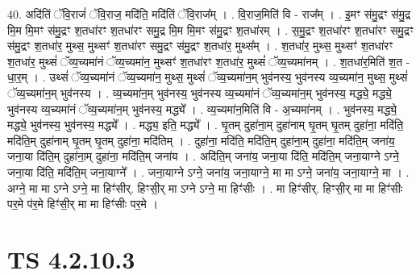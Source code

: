 \documentclass[17pt]{extarticle}
\begin{document}
40. अदि॑तिं ॅवि॒राजं॑ ॅवि॒राज॒ मदि॑ति॒ मदि॑तिं ॅवि॒राज᳚म् । . वि॒राज॒मिति॑ वि - राज᳚म् । . इ॒मꣳ स॑मु॒द्रꣳ स॑मु॒द्र मि॒म मि॒मꣳ स॑मु॒द्रꣳ श॒तधा॑रꣳ श॒तधा॑रꣳ समु॒द्र मि॒म मि॒मꣳ स॑मु॒द्रꣳ श॒तधा॑रम् । . स॒मु॒द्रꣳ श॒तधा॑रꣳ श॒तधा॑रꣳ समु॒द्रꣳ स॑मु॒द्रꣳ श॒तधा॑र॒ मुथ्स॒ मुथ्सꣳ॑ श॒तधा॑रꣳ समु॒द्रꣳ स॑मु॒द्रꣳ श॒तधा॑र॒ मुथ्स᳚म् । . श॒तधा॑र॒ मुथ्स॒ मुथ्सꣳ॑ श॒तधा॑रꣳ श॒तधा॑र॒ मुथ्सं॑ ॅव्य॒च्यमा॑नं ॅव्य॒च्यमा॑न॒ मुथ्सꣳ॑ श॒तधा॑रꣳ श॒तधा॑र॒ मुथ्सं॑ ॅव्य॒च्यमा॑नम् । . श॒तधा॑र॒मिति॑ श॒त - धा॒र॒म् । . उथ्सं॑ ॅव्य॒च्यमा॑नं ॅव्य॒च्यमा॑न॒ मुथ्स॒ मुथ्सं॑ ॅव्य॒च्यमा॑न॒म् भुव॑नस्य॒ भुव॑नस्य व्य॒च्यमा॑न॒ मुथ्स॒ मुथ्सं॑ ॅव्य॒च्यमा॑न॒म् भुव॑नस्य । . व्य॒च्यमा॑न॒म् भुव॑नस्य॒ भुव॑नस्य व्य॒च्यमा॑नं ॅव्य॒च्यमा॑न॒म् भुव॑नस्य॒ मद्ध्ये॒ मद्ध्ये॒ भुव॑नस्य व्य॒च्यमा॑नं ॅव्य॒च्यमा॑न॒म् भुव॑नस्य॒ मद्ध्ये᳚ । . व्य॒च्यमा॑न॒मिति॑ वि - अ॒च्यमा॑नम् । . भुव॑नस्य॒ मद्ध्ये॒ मद्ध्ये॒ भुव॑नस्य॒ भुव॑नस्य॒ मद्ध्ये᳚ । . मद्ध्य॒ इति॒ मद्ध्ये᳚ । . घृ॒तम् दुहा॑ना॒म् दुहा॑नाम् घृ॒तम् घृ॒तम् दुहा॑ना॒ मदि॑ति॒ मदि॑ति॒म् दुहा॑नाम् घृ॒तम् घृ॒तम् दुहा॑ना॒ मदि॑तिम् । . दुहा॑ना॒ मदि॑ति॒ मदि॑ति॒म् दुहा॑ना॒म् दुहा॑ना॒ मदि॑ति॒म् जना॑य॒ जना॒या दि॑ति॒म् दुहा॑ना॒म् दुहा॑ना॒ मदि॑ति॒म् जना॑य । . अदि॑ति॒म् जना॑य॒ जना॒या दि॑ति॒ मदि॑ति॒म् जना॒याग्ने ऽग्ने॒ जना॒या दि॑ति॒ मदि॑ति॒म् जना॒याग्ने᳚ । . जना॒याग्ने ऽग्ने॒ जना॑य॒ जना॒याग्ने॒ मा मा ऽग्ने॒ जना॑य॒ जना॒याग्ने॒ मा । . अग्ने॒ मा मा ऽग्ने ऽग्ने॒ मा हिꣳ॑सीर्. हिꣳसी॒र् मा ऽग्ने ऽग्ने॒ मा हिꣳ॑सीः । . मा हिꣳ॑सीर्. हिꣳसी॒र् मा मा हिꣳ॑सीः पर॒मे प॑र॒मे हिꣳ॑सी॒र् मा मा हिꣳ॑सीः पर॒मे । \newline
\pagebreak
{}

\section{ TS 4.2.10.3 }
\end{document}
